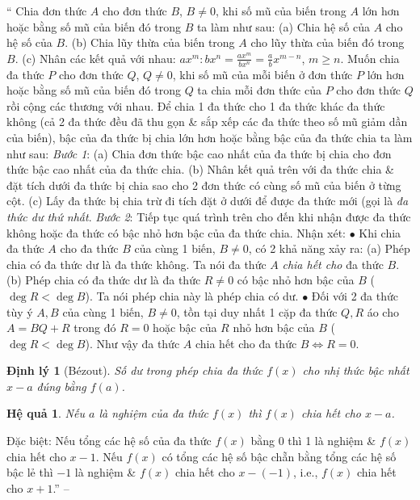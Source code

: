 \documentclass{article}
\newtheorem{dinhly}{Định lý}
\newtheorem{hequa}{Hệ quả}
\begin{document}
`` Chia đơn thức $A$ cho đơn thức $B$, $B\ne0$, khi số mũ của biến trong $A$ lớn hơn hoặc bằng số mũ của biến đó trong $B$ ta làm như sau: (a) Chia hệ số của $A$ cho hệ số của $B$. (b) Chia lũy thừa của biến trong $A$ cho lũy thừa của biến đó trong $B$. (c) Nhân các kết quả với nhau: $ax^m:bx^n = \frac{ax^m}{bx^n} = \frac{a}{b}x^{m-n}$, $m\ge n$.  Muốn chia đa thức $P$ cho đơn thức $Q$, $Q\ne0$, khi số mũ của mỗi biến ở đơn thức $P$ lớn hơn hoặc bằng số mũ của biến đó trong $Q$ ta chia mỗi đơn thức của $P$ cho đơn thức $Q$ rồi cộng các thương với nhau.  Để chia 1 đa thức cho 1 đa thức khác đa thức không (cả 2 đa thức đều đã thu gọn \& sắp xếp các đa thức theo số mũ giảm dần của biến), bậc của đa thức bị chia lớn hơn hoặc bằng bậc của đa thức chia ta làm như sau: \textit{Bước 1}: (a) Chia đơn thức bậc cao nhất của đa thức bị chia cho đơn thức bậc cao nhất của đa thức chia. (b) Nhân kết quả trên với đa thức chia \& đặt tích dưới đa thức bị chia sao cho 2 đơn thức có cùng số mũ của biến ở từng cột. (c) Lấy đa thức bị chia trừ đi tích đặt ở dưới để được đa thức mới (gọi là \textit{đa thức dư thứ nhất}. \textit{Bước 2}: Tiếp tục quá trình trên cho đến khi nhận được đa thức không hoặc đa thức có bậc nhỏ hơn bậc của đa thức chia.  Nhận xét: $\bullet$ Khi chia đa thức $A$ cho đa thức $B$ của cùng 1 biến, $B\ne0$, có 2 khả năng xảy ra: (a) Phép chia có đa thức dư là đa thức không. Ta nói đa thức $A$ \textit{chia hết cho} đa thức $B$. (b) Phép chia có đa thức dư là đa thức $R\ne0$ có bậc nhỏ hơn bậc của $B$ ($\deg R < \deg B$). Ta nói phép chia này là phép chia có dư. $\bullet$ Đối với 2 đa thức tùy ý $A,B$ của cùng 1 biến, $B\ne0$, tồn tại duy nhất 1 cặp đa thức $Q,R$ áo cho $A = BQ + R$ trong đó $R = 0$ hoặc bậc của $R$ nhỏ hơn bậc của $B$ ($\deg R < \deg B$). Như vậy đa thức $A$ chia hết cho đa thức $B\Leftrightarrow R = 0$.

\begin{dinhly}[B\'ezout]
	Số dư trong phép chia đa thức $f(x)$ cho nhị thức bậc nhất $x - a$ đúng bằng $f(a)$.
\end{dinhly}

\begin{hequa}
	Nếu $a$ là nghiệm của đa thức $f(x)$ thì $f(x)$ chia hết cho $x - a$.
\end{hequa}
Đặc biệt: Nếu tổng các hệ số của đa thức $f(x)$ bằng 0 thì 1 là nghiệm \& $f(x)$ chia hết cho $x - 1$. Nếu $f(x)$ có tổng các hệ số bậc chẵn bằng tổng các hệ số bậc lẻ thì $-1$ là nghiệm \& $f(x)$ chia hết cho $x - (-1)$, i.e., $f(x)$ chia hết cho $x + 1$.'' -- \cite[Chap. III, \S5, pp. 44--45]{Tuyen_Toan_7}
\end{document}
